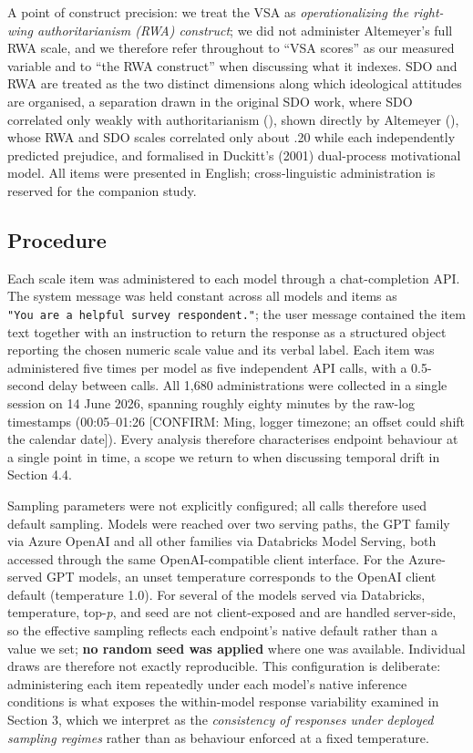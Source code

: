 \documentclass[
]{article}
\begin{document}
A point of construct precision: we treat the VSA as
\emph{operationalizing the right-wing authoritarianism (RWA) construct};
we did not administer Altemeyer's full RWA scale, and we therefore refer
throughout to ``VSA scores'' as our measured variable and to ``the RWA
construct'' when discussing what it indexes. SDO and RWA are treated as
the two distinct dimensions along which ideological attitudes are
organised, a separation drawn in the original SDO work, where SDO
correlated only weakly with authoritarianism
(), shown directly by
Altemeyer (), whose RWA and SDO scales
correlated only about .20 while each independently predicted prejudice,
and formalised in Duckitt's (2001) dual-process motivational model. All
items were presented in English; cross-linguistic administration is
reserved for the companion study.

\subsection{Procedure}\label{procedure}

Each scale item was administered to each model through a chat-completion
API. The system message was held constant across all models and items as
\texttt{"You\ are\ a\ helpful\ survey\ respondent."}; the user message
contained the item text together with an instruction to return the
response as a structured object reporting the chosen numeric scale value
and its verbal label. Each item was administered five times per model as
five independent API calls, with a 0.5-second delay between calls. All
1,680 administrations were collected in a single session on 14 June
2026, spanning roughly eighty minutes by the raw-log timestamps
(00:05--01:26 {[}CONFIRM: Ming, logger timezone; an offset could shift
the calendar date{]}). Every analysis therefore characterises endpoint
behaviour at a single point in time, a scope we return to when
discussing temporal drift in Section 4.4.

Sampling parameters were not explicitly configured; all calls therefore
used default sampling. Models were reached over two serving paths, the
GPT family via Azure OpenAI and all other families via Databricks Model
Serving, both accessed through the same OpenAI-compatible client
interface. For the Azure-served GPT models, an unset temperature
corresponds to the OpenAI client default (temperature 1.0). For several
of the models served via Databricks, temperature, top-\emph{p}, and seed
are not client-exposed and are handled server-side, so the effective
sampling reflects each endpoint's native default rather than a value we
set; \textbf{no random seed was applied} where one was available.
Individual draws are therefore not exactly reproducible. This
configuration is deliberate: administering each item repeatedly under
each model's native inference conditions is what exposes the
within-model response variability examined in Section 3, which we
interpret as the \emph{consistency of responses under deployed sampling
regimes} rather than as behaviour enforced at a fixed temperature.
\end{document}
